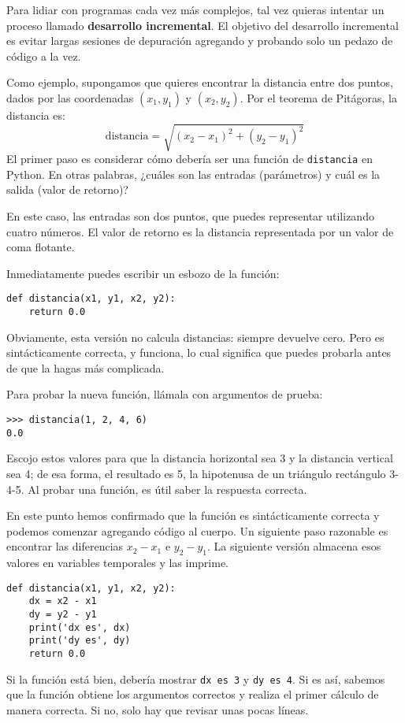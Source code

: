 \documentclass[10pt]{book}
\begin{document}
Para lidiar con programas cada vez más complejos,
tal vez quieras intentar un proceso llamado
{\bf desarrollo incremental}.  El objetivo del desarrollo incremental
es evitar largas sesiones de depuración agregando y probando solo
un pedazo de código a la vez.

Como ejemplo, supongamos que quieres encontrar la distancia entre dos
puntos, dados por las coordenadas $(x_1, y_1)$ y $(x_2, y_2)$.
Por el teorema de Pitágoras, la distancia es:
\begin{displaymath}
\mathrm{distancia} = \sqrt{(x_2 - x_1)^2 + (y_2 - y_1)^2}
\end{displaymath}
%
El primer paso es considerar cómo debería ser una función de {\tt distancia}
en Python.  En otras palabras, ¿cuáles son las entradas (parámetros)
y cuál es la salida (valor de retorno)?

En este caso, las entradas son dos puntos, que puedes representar
utilizando cuatro números.  El valor de retorno es la distancia representada por
un valor de coma flotante.

Inmediatamente puedes escribir un esbozo de la función:

\begin{verbatim}
def distancia(x1, y1, x2, y2):
    return 0.0
\end{verbatim}
%
Obviamente, esta versión no calcula distancias: siempre devuelve
cero.  Pero es sintácticamente correcta, y funciona, lo cual significa que
puedes probarla antes de que la hagas más complicada.

Para probar la nueva función, llámala con argumentos de prueba:

\begin{verbatim}
>>> distancia(1, 2, 4, 6)
0.0
\end{verbatim}
%
Escojo estos valores para que la distancia horizontal sea 3 y la
distancia vertical sea 4; de esa forma, el resultado es 5, la hipotenusa
de un triángulo rectángulo 3-4-5. Al probar una función, es
útil saber la respuesta correcta.

En este punto hemos confirmado que la función es sintácticamente
correcta y podemos comenzar agregando código al cuerpo.
Un siguiente paso razonable es encontrar las diferencias
$x_2 - x_1$ e $y_2 - y_1$.  La siguiente versión almacena esos valores en
variables temporales y las imprime.

\begin{verbatim}
def distancia(x1, y1, x2, y2):
    dx = x2 - x1
    dy = y2 - y1
    print('dx es', dx)
    print('dy es', dy)
    return 0.0
\end{verbatim}
%
Si la función está bien, debería mostrar \verb"dx es 3" y
\verb"dy es 4".  Si es así, sabemos que la función obtiene los argumentos
correctos y realiza el primer cálculo de manera correcta.  Si no,
solo hay que revisar unas pocas líneas.
\end{document}
